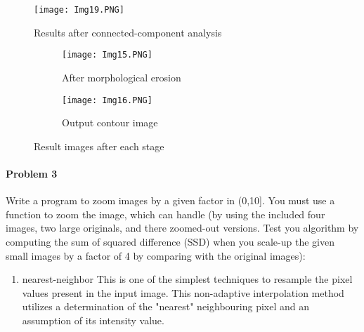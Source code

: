 \documentclass[11pt]{scrartcl}
\begin{document}
{\begin{figure}[h!]
    \centering
    \texttt{[image: Img19.PNG]}
    \caption{Results after connected-component analysis}
    \label{fig: PaleBlueDot}    
\end{figure}

\begin{figure}
\centering
\begin{subfigure}{.5\textwidth}
  \centering
  \texttt{[image: Img15.PNG]}
  \caption{After morphological erosion}
  \label{fig:sub1}
\end{subfigure}%
\begin{subfigure}{0.5\textwidth}
  \centering
  \texttt{[image: Img16.PNG]}
  \caption{Output contour image}
  \label{fig:sub2}
\end{subfigure}
\caption{Result images after each stage}
\label{fig:test}
\end{figure}

\paragraph*{Problem 3}
Write a program to zoom images by a given factor in (0,10]. You must use a function to zoom the image, which can handle (by using the included four images, two large originals, and there zoomed-out versions. Test you algorithm by computing the sum of squared difference (SSD) when you scale-up the given small images by a factor of 4 by comparing with the original images):
\begin{enumerate}[label=(\alph*)]

\begin{figure}
\centering
\begin{subfigure}{.5\textwidth}
  \centering
  \texttt{[image: Img28.PNG]}
  \caption{Nearest-neighbour interpolation using for loops}
  \label{fig:sub1}
\end{subfigure}%
\begin{subfigure}{0.5\textwidth}
  \centering
  \texttt{[image: Img22.PNG]}
  \caption{SSD value for im01.png and zoomed version of im01small.png}
  \label{fig:sub2}
\end{subfigure}
\caption{Nearest-neighbour interpolation and SSD}
\label{fig:test}
\end{figure}

\item nearest-neighbor \newline
This is one of the simplest techniques to re\-sample the pixel values present in the input image. This non-adaptive interpolation method utilizes a determination of the "nearest" neighbouring pixel and an assumption of its intensity value. 


\end{enumerate}}
\end{document}
